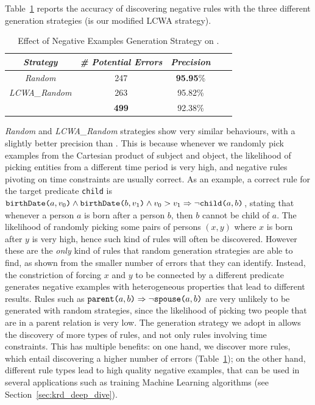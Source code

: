Table~\ref{tab:random_neg_examples} reports the accuracy of discovering negative rules with the three different generation strategies (\krd is our modified LCWA strategy).
\begin{table}[htb]
	\centering
	\caption{Effect of Negative Examples Generation Strategy on \dbpedia.}
	\label{tab:random_neg_examples}
	\begin{tabular}{|c|c|c|c|c|}
		\hline
		\hline
		{\it Strategy}&{\it \# Potential Errors} & {\it Precision} \tabularnewline
		\hline
		\emph{Random} & 247 & \textbf{95.95}\%\tabularnewline
		\emph{LCWA\_Random} & 263 & 95.82\% \tabularnewline
		\krd & \textbf{499} & 92.38\%\tabularnewline
		\hline
	\end{tabular}
\end{table}
\emph{Random} and \emph{LCWA\_Random} strategies show very similar behaviours, with a slightly better precision than \krd. This is because whenever we randomly pick examples from the Cartesian product of subject and object, the likelihood of picking entities from a different time period is very high, and negative rules pivoting on time constraints are usually correct.
As an example, a correct rule for the target predicate \texttt{child} is $\texttt{birthDate(}a,v_0\texttt{)} \wedge \texttt{birthDate(}b,v_1\texttt{)} \wedge v_0 > v_1 \Rightarrow \neg \texttt{child(}a,b\texttt{)}$, stating that whenever a person $a$ is born after a person $b$, then $b$ cannot be child of $a$.
The likelihood of randomly picking some pairs of persons $(x,y)$ where $x$ is born after $y$ is very high, hence such kind of rules will often be discovered. However these are the \emph{only} kind of rules that random generation strategies are able to find, as shown from the smaller number of errors that they can identify. 
Instead, the constriction of forcing $x$ and $y$ to be connected by a different predicate generates  negative examples with heterogeneous properties that lead to different results. Rules such as $\texttt{parent(}a,b\texttt{)} \Rightarrow \neg \texttt{spouse(}a,b\texttt{)}$ are very unlikely to be generated with random strategies, since the likelihood of picking two people that are in a parent relation is very low. The generation strategy we adopt in \krd allows the discovery of more types of rules, and not only rules involving time constraints. This has multiple benefits: on one hand, we discover more rules, which entail discovering a higher number of errors (Table~\ref{tab:random_neg_examples}); on the other hand, different rule types lead to high quality negative examples, that can be used in several applications such as training Machine Learning algorithms (see Section~\ref{sec:krd_deep_dive}).

